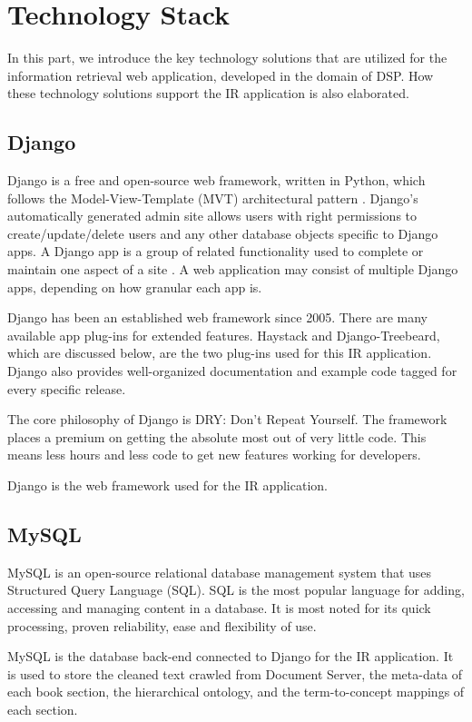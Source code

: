 \section{Technology Stack}
\label{sec:tech_stack}
In this part, we introduce the key technology solutions that are utilized for the information retrieval web application, developed in the domain of DSP. How these technology solutions support the IR application is also elaborated.
  
\subsection{Django}
Django is a free and open-source web framework, written in Python, which follows the Model-View-Template (MVT) architectural pattern \cite{Django}. Django's automatically generated admin site allows users with right permissions to create/update/delete users and any other database objects specific to Django apps. A Django app is a group of related functionality used to complete or maintain one aspect of a site \cite{DjangoApp}. A web application may consist of multiple Django apps, depending on how granular each app is.

Django has been an established web framework since 2005. There are many available app plug-ins for extended features. Haystack and Django-Treebeard, which are discussed below, are the two plug-ins used for this IR application. Django also provides well-organized documentation and example code tagged for every specific release. 

The core philosophy of Django is DRY: Don't Repeat Yourself. The framework places a premium on getting the absolute most out of very little code. This means less hours and less code to get new features working for developers.

Django is the web framework used for the IR application.

\subsection{MySQL}
MySQL is an open-source relational database management system that uses Structured Query Language (SQL). SQL is the most popular language for adding, accessing and managing content in a database. It is most noted for its quick processing, proven reliability, ease and flexibility of use. 

MySQL is the database back-end connected to Django for the IR application. It is used to store the cleaned text crawled from Document Server, the meta-data of each book section, the hierarchical ontology, and the term-to-concept mappings of each section. 

